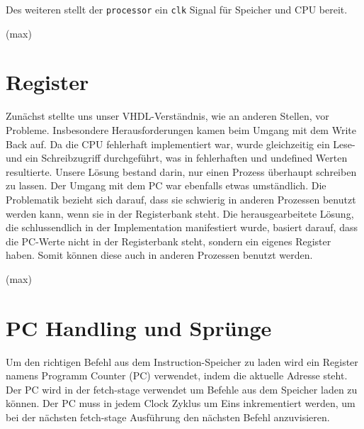 \documentclass[paper=a4,fontsize=12pt,twocolumn]{scrreprt}
\begin{document}
Des weiteren stellt der \texttt{processor} ein \texttt{clk} Signal für Speicher und CPU bereit.

(max)

\section{Register}





Zunächst stellte uns unser VHDL-Verständnis, wie an anderen Stellen, vor Probleme.
Insbesondere Herausforderungen kamen beim Umgang mit dem Write Back auf.
Da die CPU fehlerhaft implementiert war, wurde gleichzeitig ein Lese- und ein Schreibzugriff durchgeführt, was in fehlerhaften und undefined Werten resultierte. 
Unsere Lösung bestand darin, nur einen Prozess überhaupt schreiben zu lassen. Der Umgang mit dem PC war ebenfalls etwas umständlich.
Die Problematik bezieht sich darauf, dass sie schwierig in anderen Prozessen benutzt werden kann, wenn sie in der Registerbank steht.
Die herausgearbeitete Lösung, die schlussendlich in der Implementation manifestiert wurde, basiert darauf, dass die PC-Werte nicht in der Registerbank steht, sondern ein eigenes Register haben.
Somit können diese auch in anderen Prozessen benutzt werden.

(max)

\section{PC Handling und Sprünge}

Um den richtigen Befehl aus dem Instruction-Speicher zu laden wird ein Register namens Programm Counter (PC) verwendet, indem die aktuelle Adresse steht. Der PC wird in der fetch-stage verwendet um Befehle aus dem Speicher laden zu können. Der PC muss in jedem Clock Zyklus um Eins inkrementiert werden, um bei der nächsten fetch-stage Ausführung den nächsten Befehl anzuvisieren. 
\end{document}
